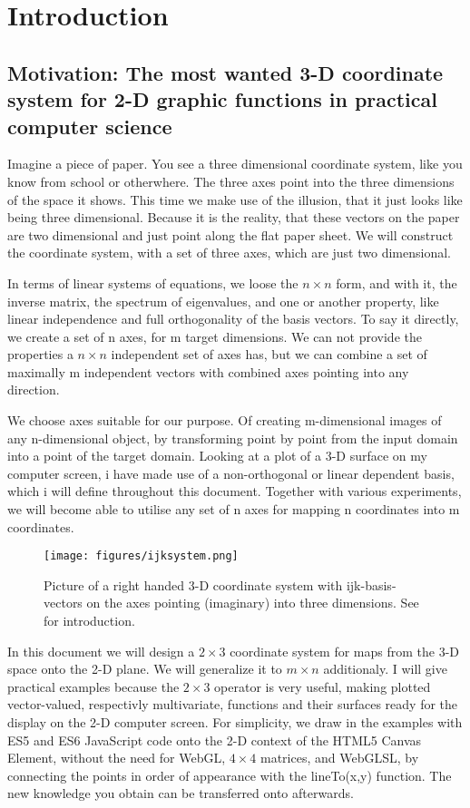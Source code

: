 \documentclass[a4paper]{article}
\begin{document}
\section{Introduction}

\subsection{Motivation: The most wanted 3-D coordinate system for 2-D graphic functions in practical computer science}

Imagine a piece of paper. You see a three dimensional coordinate system, like you know from school or otherwhere.
The three axes point into the three dimensions of the space it shows. This time we make use of the illusion, that it just looks like being three dimensional. Because it is the reality, that these vectors on the paper are two dimensional and just point along the flat paper sheet. We will construct the coordinate system, with a set of three axes, which are just two dimensional.

In terms of linear systems of equations, we loose the $n \times n$ form, and with it, the inverse matrix, the spectrum of eigenvalues, and one or another property, like linear independence and full orthogonality of the basis vectors. To say it directly, we create a set of n axes, for m target dimensions. We can not provide
the properties a $n \times n$ independent set of axes has, but we can combine a set of maximally m independent vectors with 
combined axes pointing into any direction.

We choose axes suitable for our purpose. Of creating m-dimensional images of any n-dimensional object, by transforming point 
by point from the input domain into a point of the target domain. Looking at a plot of a 3-D surface on my computer screen, i 
have made use of a non-orthogonal or linear dependent basis, which i will define throughout this document. Together with various experiments, we will become able to utilise any set of n axes for mapping n coordinates into m coordinates.

\begin{figure}[ht]
\label{ijksystem}
\texttt{[image: figures/ijksystem.png]}\\
\caption{Picture of a right handed 3-D coordinate system with ijk-basis-vectors on the axes pointing (imaginary)
into three dimensions. See \cite{Corral1} for introduction.}
\end{figure}

In this document we will design a $2 \times 3$ coordinate system for maps from the 3-D space onto the 2-D plane. We will generalize it to $m \times n$ additionaly. I will give practical examples 
because the $2 \times 3$ operator is very useful, making plotted vector-valued, respectivly multivariate, functions and their surfaces ready for the display on the 2-D computer screen. For simplicity, we draw in the examples with ES5 and ES6 JavaScript code onto the 2-D context of the HTML5 Canvas Element, without the need for WebGL, $4 \times 4$ matrices, and WebGLSL, by connecting the points in order of appearance with the lineTo(x,y) function. The new knowledge you obtain can be transferred onto afterwards.\\
\end{document}
